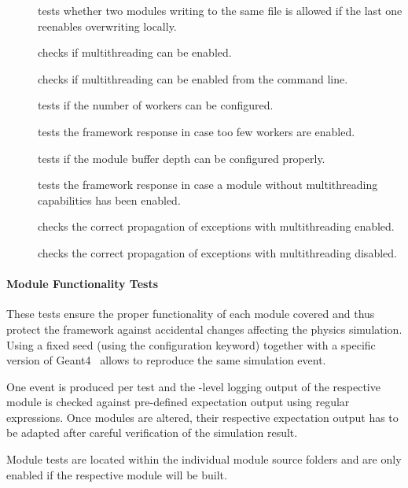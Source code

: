 \begin{description}
    \item[] tests whether two modules writing to the same file is allowed if the last one reenables overwriting locally.
    \item[] checks if multithreading can be enabled.
    \item[] checks if multithreading can be enabled from the command line.
    \item[] tests if the number of workers can be configured.
    \item[] tests the framework response in case too few workers are enabled.
    \item[] tests if the module buffer depth can be configured properly.
    \item[] tests the framework response in case a module without multithreading capabilities has been enabled.
    \item[] checks the correct propagation of exceptions with multithreading enabled.
    \item[] checks the correct propagation of exceptions with multithreading disabled.
\end{description}


\paragraph{Module Functionality Tests}

These tests ensure the proper functionality of each module covered and thus protect the framework against accidental changes affecting the physics simulation.
Using a fixed seed (using the  configuration keyword) together with a specific version of Geant4~\cite{geant4} allows to reproduce the same simulation event.

One event is produced per test and the -level logging output of the respective module is checked against pre-defined expectation output using regular expressions.
Once modules are altered, their respective expectation output has to be adapted after careful verification of the simulation result.

Module tests are located within the individual module source folders and are only enabled if the respective module will be built.


